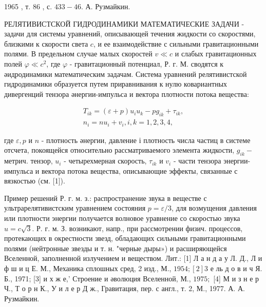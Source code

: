 \documentclass[10pt]{article}
\begin{document}
1965 , т. 86 , с. $433-46$. А. Рузмайкин.



РЕЛЯТИВИСТСКОЙ ГИДРОДИНАМИКИ МАТЕМАТИЧЕСКИЕ ЗАДАЧИ - задачи для системы уравнений, описывающей течения жидкости со скоростями, близкими к скорости света $c$, и ее взаимодействие с сильными гравитационными полями. В предельном случае малых скоростей $v \ll c$ и слабых гравитационных полей $\varphi \ll c^{2}$, где $\varphi$ - гравитационный потенциал, Р. г. М. сводятся к әидродинамики математическим задачам. Система уравнений релятивистской гидродинамики образуется путем приравнивания к нулю ковариантных дивергенций тензора әнергии-импульса и вектора плотности потока вещества:



\[

\begin{gathered}

T_{i k}=(\varepsilon+p) u_{i} u_{k}-p g_{i k}+\tau_{i k}, \\

n_{i}=n u_{i}+v_{i}, i, k=1,2,3,4,

\end{gathered}

\]



где $\varepsilon, p$ и $n$ - плотность әнергии, давление і плотность числа частиц в системе отсчета, покоящейся относительно рассматриваемого элемента жидкости, $g_{i k}-$ метрич. тензор, $u_{i}$ - четырехмерная скорость, $\tau_{i k}$ и $v_{i}$ - части тензора энергии-импульса и вектора потока вещества, описывающие эффекты, связанные с вязкостью (см. [1]).



Пример решений Р. г. м. з.: распространение звука в веществе с ультрарелятивистским уравнением состояния $p=\varepsilon / 3$, для возмущения давления или плотности энергии получается волновое уравнение со скоростью звука $u=c \sqrt{3}$. Р. г. м. З. возникают, напр., при рассмотрении физич. процессов, протекающих в окрестности звезд, обладающих сильными гравитационными полями (нейтронные звезды и т. н. "черные дыры») и расширяющейся Вселенной, заполненной излучением и веществом. Лит.: [1] Л а н д а у Л. Д., Л и ф ш и ц Е. М., Механика сплошных сред, 2 изд., М., $1954 ;[2] 3$ е ль д о в и ч Я. Б., 1971; [3] и х ж е,' Строение и әволюция Вселенной, М., $1975 ;$ [4] М и з н е р Ч., Т о р н К., У и л е р Д ж., Гравитация, пер. с англ., т. 2, М., 1977. А. А. Рузмайкин.
\end{document}
